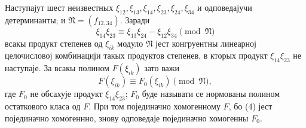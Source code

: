 ﻿\documentclass[11pt]{article}
\providecommand{\frN}{\mathfrak N}
\begin{document}
Наступајут шест неизвестных \(\xi_{12},\xi_{13},\xi_{14},\xi_{23},\xi_{24},\xi_{34}\) и одповедајучи детерминанты; и \(\frN=(f_{12,34})\). Заради
\begin{equation}
        \xi_{14}\xi_{23}\equiv \xi_{13}\xi_{24}-\xi_{12}\xi_{34}\pmod{\frN}
\end{equation}
всакы продукт степенев од \(\xi_{ik}\) модуло \(\frN\) јест конгруентны линеарној целочисловој комбинацији такых продуктов степенев, в кторых продукт \(\xi_{14}\xi_{23}\) не наступаје. За всакы полином \(F(\xi_{ik})\) зато важи
\begin{equation}
        F(\xi_{ik})\equiv F_0(\xi_{ik})\pmod{\frN},
\end{equation}
где \(F_0\) не обсахује продукт \(\xi_{14}\xi_{23}\); \(F_0\) буде называти се нормованы полином остаткового класа од \(F\). При том појединачно хомогенному \(F\), бо (4) јест појединачно хомогеннно, знову одповедаје појединачно хомогенны \(F_0\).
\end{document}
